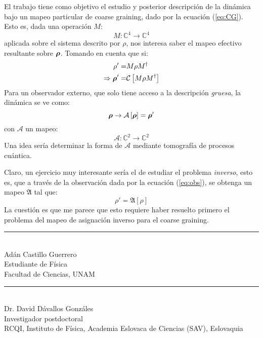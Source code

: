 \documentclass[onecolumn,11pt]{article}
\newcommand{\Cc}{\mathcal{C}} %
\newcommand{\Hh}{\mathbb{C}} %
\newcommand{\CG}[1]{\Cc\left[#1\right]}
\newcommand*{\B}[1]{\ifmmode\bm{#1}\else\textbf{#1}\fi}
\begin{document}
El trabajo tiene como objetivo el estudio y posterior descripción de la dinámica bajo un mapeo particular de coarse graining, dado por la ecuación (\ref{eq:CG}). Esto es, dada una operación $M$:
\begin{equation}
    M:\Hh^{4}\rightarrow\Hh^{4}
\end{equation}
aplicada sobre el sistema descrito por $\rho$, nos interesa saber el mapeo efectivo resultante sobre $\B{\rho}$. Tomando en cuenta que si:
\begin{align}
    \rho'=&M\rho M^{\dag}\\
    \Rightarrow \B{\rho}'=&\CG{M\rho M^{\dag}}
\end{align}
Para un observador externo, que solo tiene acceso a la descripción \textit{gruesa}, la dinámica se ve como:
\begin{equation}\label{eq:obs}
    \B{\rho}\rightarrow\mathcal{A}\left[\B{\rho}\right]=\B{\rho}'
\end{equation}
con $\mathcal{A}$ un mapeo:
\begin{equation}
    \mathcal{A}:\Hh^{2}\rightarrow\Hh^{2}
\end{equation}
Una idea sería determinar la forma de $\mathcal{A}$ mediante tomografía de procesos cuántica. 

Claro, un ejercicio muy interesante sería el de estudiar el problema \textit{inverso}, esto es, que a través de la observación dada por la ecuación (\ref{eq:obs}), se obtenga un mapeo $\mathfrak{A}$ tal que:
\begin{equation}
    \rho'=\mathfrak{A}\left[\rho\right]
\end{equation}
La cuestión es que me parece que esto requiere haber resuelto primero el problema del mapeo de asignación inverso para el coarse graining.


\begin{center}
    \rule{200pt}{0.4pt}\\
    Adán Castillo Guerrero \\
    Estudiante de Física \\
    Facultad de Ciencias, UNAM \\
    
\end{center}

\vspace{1.0cm}

\begin{center}
    \rule{200pt}{0.4pt}\\
    Dr. David Dávallos Gonzáles \\
    Investigador postdoctoral \\
    RCQI, Instituto de Física, Academia Eslovaca de Ciencias (SAV), Eslovaquia\\
    
\end{center}
\end{document}
